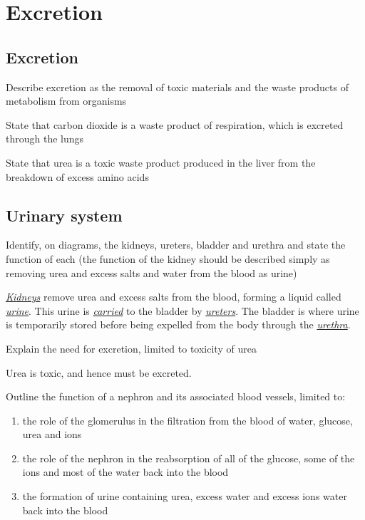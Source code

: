 \section{Excretion}
\subsection{Excretion}

\begin{point}
Describe excretion as the removal of toxic materials and the waste products of metabolism from 
organisms
\end{point}

\begin{point}
State that carbon dioxide is a waste product of respiration, which is excreted through the lungs
\end{point}


\begin{point}
State that urea is a toxic waste product produced in the liver from the breakdown of excess amino acids
\end{point}

\subsection{Urinary system}

\begin{point}
Identify, on diagrams, the kidneys, ureters, bladder and urethra and state the function of each (the 
function of the kidney should be described simply as removing urea and excess salts and water from the 
blood as urine)
\end{point}

\underline{\emph{Kidneys}} remove urea and excess salts from the blood, forming a liquid called 
\underline{\emph{urine}}. This urine is \underline{\emph{carried}} to the bladder by 
\underline{\emph{ureters}}. The bladder is where urine is temporarily stored before being 
expelled from the body through the \underline{\emph{urethra}}.

\begin{point}
Explain the need for excretion, limited to toxicity of urea
\end{point}

Urea is toxic, and hence must be excreted.

\begin{point}
Outline the function of a nephron and its associated blood vessels, limited to:
\begin{enumerate}[label=(\alph*)]
	\setlength\itemsep{0em}
	\item the role of the glomerulus in the filtration from the blood of water, glucose, urea and ions
	\item the role of the nephron in the reabsorption of all of the glucose, some of the ions and most of the 
		water back into the blood
	\item the formation of urine containing urea, excess water and excess ions 
		water back into the blood
\end{enumerate}
\end{point}

